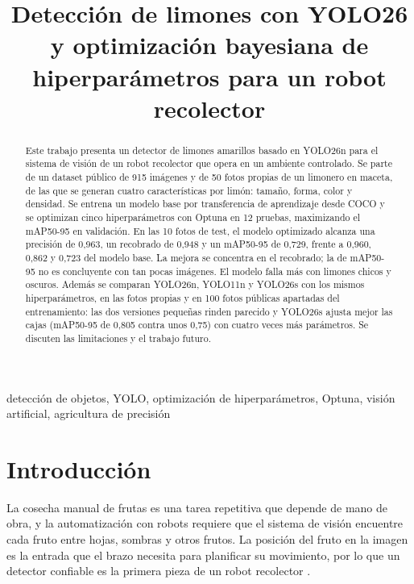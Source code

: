 \documentclass[conference]{IEEEtran}
\begin{document}
\title{Detección de limones con YOLO26 y optimización bayesiana de hiperparámetros para un robot recolector}

\author{
}

\maketitle

\begin{abstract}
Este trabajo presenta un detector de limones amarillos basado en YOLO26n para el sistema de visión de un robot recolector que opera en un ambiente controlado. Se parte de un dataset público de 915 imágenes y de 50 fotos propias de un limonero en maceta, de las que se generan cuatro características por limón: tamaño, forma, color y densidad. Se entrena un modelo base por transferencia de aprendizaje desde COCO y se optimizan cinco hiperparámetros con Optuna en 12 pruebas, maximizando el mAP50-95 en validación. En las 10 fotos de test, el modelo optimizado alcanza una precisión de 0,963, un recobrado de 0,948 y un mAP50-95 de 0,729, frente a 0,960, 0,862 y 0,723 del modelo base. La mejora se concentra en el recobrado; la de mAP50-95 no es concluyente con tan pocas imágenes. El modelo falla más con limones chicos y oscuros. Además se comparan YOLO26n, YOLO11n y YOLO26s con los mismos hiperparámetros, en las fotos propias y en 100 fotos públicas apartadas del entrenamiento: las dos versiones pequeñas rinden parecido y YOLO26s ajusta mejor las cajas (mAP50-95 de 0,805 contra unos 0,75) con cuatro veces más parámetros. Se discuten las limitaciones y el trabajo futuro.
\end{abstract}

\begin{IEEEkeywords}
detección de objetos, YOLO, optimización de hiperparámetros, Optuna, visión artificial, agricultura de precisión
\end{IEEEkeywords}

\section{Introducción}
La cosecha manual de frutas es una tarea repetitiva que depende de mano de obra, y la automatización con robots requiere que el sistema de visión encuentre cada fruto entre hojas, sombras y otros frutos. La posición del fruto en la imagen es la entrada que el brazo necesita para planificar su movimiento, por lo que un detector confiable es la primera pieza de un robot recolector \cite{zhao2016}.
\end{document}
